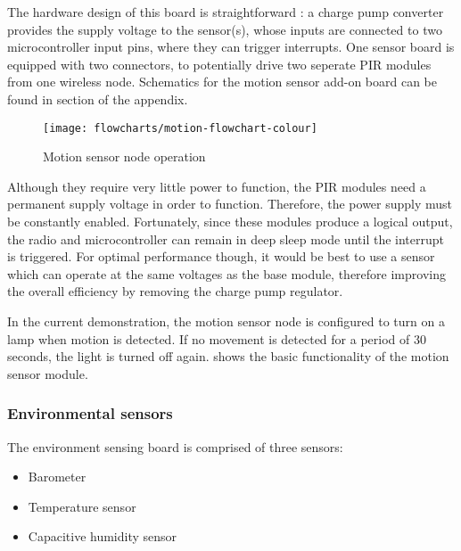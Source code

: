 The hardware design of this board is straightforward : a charge pump converter
provides the supply voltage to the sensor(s), whose inputs are connected to two
microcontroller input pins, where they can trigger interrupts. One sensor board
is equipped with two connectors, to potentially drive two seperate PIR modules
from one wireless node. Schematics for the motion sensor add-on board can be
found in section  of the appendix.

\begin{figure}[!h]
  \begin{center}
    \texttt{[image: flowcharts/motion-flowchart-colour]}
  \end{center}
  \caption{Motion sensor node operation}
  \label{fig:motion-flowchart}
\end{figure}

Although they require very little power to function, the PIR modules need a
permanent supply voltage in order to function. Therefore, the power supply must
be constantly enabled. Fortunately, since these modules produce a logical
output, the radio and microcontroller can remain in deep sleep mode until the
interrupt is triggered. For optimal performance though, it would be best to use
a sensor which can operate at the same voltages as the base module, therefore
improving the overall efficiency by removing the charge pump regulator.


In the current demonstration, the motion sensor node is configured to turn on a
lamp when motion is detected. If no movement is detected for a period of 30
seconds, the light is turned off again.  shows the
basic functionality of the motion sensor module.

\subsubsection{Environmental sensors}

The environment sensing board is comprised of three sensors:

\begin{itemize}
  \item Barometer
  \item Temperature sensor
  \item Capacitive humidity sensor
\end{itemize}


